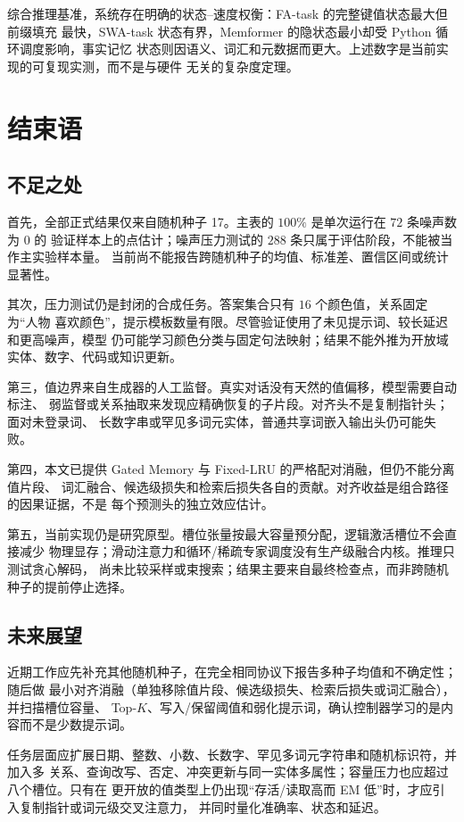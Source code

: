\documentclass[letterpaper]{article}
\begin{document}
综合推理基准，系统存在明确的状态--速度权衡：FA-task 的完整键值状态最大但前缀填充
最快，SWA-task 状态有界，Memformer 的隐状态最小却受 Python 循环调度影响，事实记忆
状态则因语义、词汇和元数据而更大。上述数字是当前实现的可复现实测，而不是与硬件
无关的复杂度定理。

\section{结束语}

\subsection{不足之处}

首先，全部正式结果仅来自随机种子 17。主表的 $100\%$ 是单次运行在 $72$ 条噪声数为 0 的
验证样本上的点估计；噪声压力测试的 $288$ 条只属于评估阶段，不能被当作主实验样本量。
当前尚不能报告跨随机种子的均值、标准差、置信区间或统计显著性。

其次，压力测试仍是封闭的合成任务。答案集合只有 $16$ 个颜色值，关系固定为“人物
喜欢颜色”，提示模板数量有限。尽管验证使用了未见提示词、较长延迟和更高噪声，模型
仍可能学习颜色分类与固定句法映射；结果不能外推为开放域实体、数字、代码或知识更新。

第三，值边界来自生成器的人工监督。真实对话没有天然的值偏移，模型需要自动标注、
弱监督或关系抽取来发现应精确恢复的子片段。对齐头不是复制指针头；面对未登录词、
长数字串或罕见多词元实体，普通共享词嵌入输出头仍可能失败。

第四，本文已提供 Gated Memory 与 Fixed-LRU 的严格配对消融，但仍不能分离值片段、
词汇融合、候选级损失和检索后损失各自的贡献。对齐收益是组合路径的因果证据，不是
每个预测头的独立效应估计。

第五，当前实现仍是研究原型。槽位张量按最大容量预分配，逻辑激活槽位不会直接减少
物理显存；滑动注意力和循环/稀疏专家调度没有生产级融合内核。推理只测试贪心解码，
尚未比较采样或束搜索；结果主要来自最终检查点，而非跨随机种子的提前停止选择。

\subsection{未来展望}

近期工作应先补充其他随机种子，在完全相同协议下报告多种子均值和不确定性；随后做
最小对齐消融（单独移除值片段、候选级损失、检索后损失或词汇融合），并扫描槽位容量、
Top-$K$、写入/保留阈值和弱化提示词，确认控制器学习的是内容而不是少数提示词。

任务层面应扩展日期、整数、小数、长数字、罕见多词元字符串和随机标识符，并加入多
关系、查询改写、否定、冲突更新与同一实体多属性；容量压力也应超过八个槽位。只有在
更开放的值类型上仍出现“存活/读取高而 EM 低”时，才应引入复制指针或词元级交叉注意力，
并同时量化准确率、状态和延迟。
\end{document}
